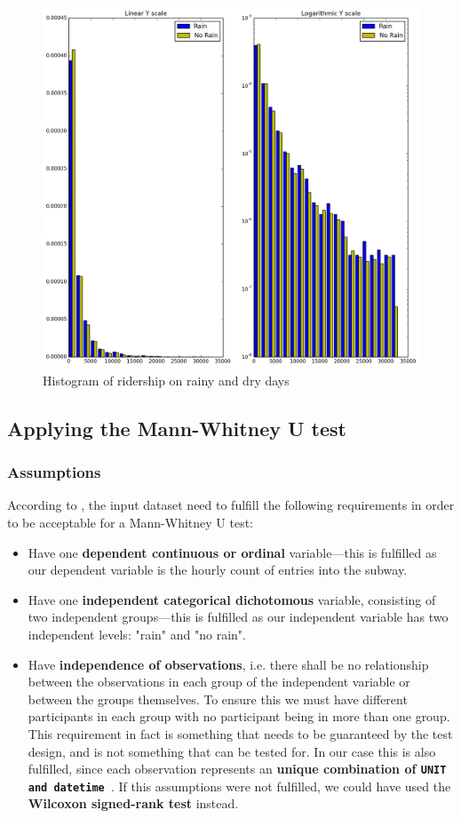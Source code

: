 \documentclass{article}
\begin{document}
\begin{figure}[ht]
\centering
\includegraphics[scale=0.6]{histo_rainy_dry.png}
\caption{Histogram of ridership on rainy and dry days}
\label{fig:histo_rainy_dry}
\end{figure}

\subsection{Applying the Mann-Whitney U test}

\subsubsection{Assumptions}
According to \cite{mannwhitney_spss}, the input dataset need to fulfill the following requirements in order to be acceptable for a Mann-Whitney U test:
\begin{itemize}
\item Have one \textbf{dependent continuous or ordinal} variable---this is fulfilled as our dependent variable is the hourly count of entries into the subway.
\item Have one \textbf{independent categorical dichotomous} variable, consisting of two independent groups---this is fulfilled as our independent variable has two independent levels: "rain" and "no rain".
\item Have \textbf{independence of observations}, i.e. there shall be no relationship between the observations in each group of the independent variable or between the groups themselves. To ensure this we must have different participants in each group with no participant being in more than one group. This requirement in fact is something that needs to be guaranteed by the test design, and is not something that can be tested for. In our case this is also fulfilled, since each observation represents an \textbf{unique combination of \tt UNIT \rm and \tt datetime \rm}. If this assumptions were not fulfilled, we could have used the \textbf{Wilcoxon signed-rank test} instead.
\end{itemize}
\end{document}
